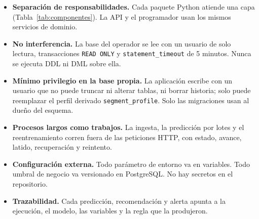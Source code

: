 \documentclass[10pt,a4paper]{article}
\newcommand{\cod}[1]{\texttt{\small #1}}
\begin{document}
\begin{itemize}
  \setlength{\itemsep}{0.1em}
  \item \textbf{Separación de responsabilidades.} Cada paquete Python atiende una capa (Tabla~\ref{tab:componentes}). La API y el programador usan los mismos servicios de dominio.
  \item \textbf{No interferencia.} La base del operador se lee con un usuario de solo lectura, transacciones \cod{READ ONLY} y \cod{statement\_timeout} de 5 minutos. Nunca se ejecuta DDL ni DML sobre ella.
  \item \textbf{Mínimo privilegio en la base propia.} La aplicación escribe con un usuario que no puede truncar ni alterar tablas, ni borrar historia; solo puede reemplazar el perfil derivado \cod{segment\_profile}. Solo las migraciones usan al dueño del esquema.
  \item \textbf{Procesos largos como trabajos.} La ingesta, la predicción por lotes y el reentrenamiento corren fuera de las peticiones HTTP, con estado, avance, latido, recuperación y reintento.
  \item \textbf{Configuración externa.} Todo parámetro de entorno va en variables. Todo umbral de negocio va versionado en PostgreSQL. No hay secretos en el repositorio.
  \item \textbf{Trazabilidad.} Cada predicción, recomendación y alerta apunta a la ejecución, el modelo, las variables y la regla que la produjeron.
\end{itemize}
\end{document}
